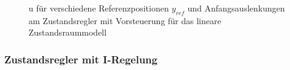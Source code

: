\documentclass[
	pagesize,
	fontsize=12pt,
	paper=a4,
	oneside,
   reqno
]{scrartcl}
\begin{document}
\begin{figure}[H]
    \centering
    \caption[u für Regler mit Vorsteuerung (linear)]{u für verschiedene Referenzpositionen $y_{ref}$ und Anfangsauslenkungen am Zustandsregler mit Vorsteuerung für das lineare Zustandsraummodell}
    \label{fig:Bild17}
\end{figure}

\subsubsection{Zustandsregler mit I-Regelung}
\end{document}
